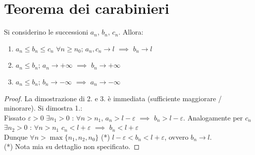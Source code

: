 \documentclass[10pt, oneside]{book}
\theoremstyle{plain}
\begin{document}
\section{Teorema dei carabinieri}
\begin{ther}
    Si considerino le successioni $a_n$, $b_n$, $c_n$. Allora:
    \begin{enumerate}
        \item $a_n \leq b_n \leq c_n$ $\forall n \geq n_0$; $a_n, c_n \rightarrow l$ $\implies$ $b_n \rightarrow l$
        \item $a_n \leq b_n$; $a_n \rightarrow +\infty$ $\implies$ $b_n \rightarrow +\infty$
        \item $a_n \leq b_n$; $b_n \rightarrow -\infty$ $\implies$ $a_n \rightarrow -\infty$
    \end{enumerate}
\end{ther}
\begin{proof}
    La dimostrazione di 2. e 3. è immediata (sufficiente maggiorare / minorare). Si dimostra 1.:
    \\Fissato $\varepsilon > 0$ $\exists n_1 > 0$ : $\forall n > n_1$, $a_n > l - \varepsilon$ $\implies$ $b_n > l - \varepsilon$. Analogamente per $c_n$ $\exists n_2 > 0$ : $\forall n > n_1$ $c_n < l + \varepsilon$ $\implies$ $b_n < l + \varepsilon$
    \\Dunque $\forall n > \max \{n_1, n_2, n_0\}$ (*) $l-\varepsilon < b_n < l + \varepsilon$, ovvero $b_n \rightarrow l$.
    \\(*) Nota mia su dettaglio non specificato.
\end{proof}
\end{document}
